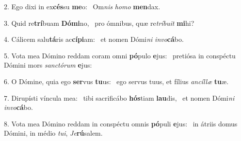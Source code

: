 2. Ego dixi in ex\textbf{cés}su \textbf{me}o: \ast\  Om\textit{nis} \textit{ho}\textit{mo} \textbf{men}dax.\

3. Quid re\textbf{trí}buam \textbf{Dó}\textbf{mi}no, \ast\  pro ómnibus, quæ re\textit{trí}\textit{bu}\textit{it} \textbf{mi}hi?\

4. Cálicem salu\textbf{tá}ris ac\textbf{cí}\textbf{pi}am: \ast\  et nomen Dómi\textit{ni} \textit{in}\textit{vo}\textbf{cá}bo.\

5. Vota mea Dómino reddam coram omni \textbf{pó}pulo \textbf{e}jus: \ast\  pretiósa in conspéctu Dómini mors \textit{sanc}\textit{tó}\textit{rum} \textbf{e}jus:\

6. O Dómine, quia ego \textbf{ser}vus \textbf{tu}us: \ast\  ego servus tuus, et fílius \textit{an}\textit{cíl}\textit{læ} \textbf{tu}æ.\

7. Dirupísti víncula mea: \dag\  tibi sacrificábo \textbf{hós}tiam \textbf{lau}dis, \ast\  et nomen Dómi\textit{ni} \textit{in}\textit{vo}\textbf{cá}bo.\

8. Vota mea Dómino reddam in conspéctu omnis \textbf{pó}puli \textbf{e}jus: \ast\  in átriis domus Dómini, in médio \textit{tu}\textit{i}, \textit{Je}\textbf{rú}salem.\

